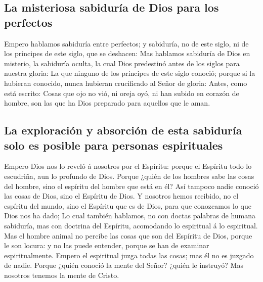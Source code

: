 \hypertarget{la-misteriosa-sabiduruxeda-de-dios-para-los-perfectos}{%
\subsection{La misteriosa sabiduría de Dios para los
perfectos}\label{la-misteriosa-sabiduruxeda-de-dios-para-los-perfectos}}

 Empero hablamos sabiduría entre perfectos; y sabiduría,
no de este siglo, ni de los príncipes de este siglo, que se deshacen:
 Mas hablamos sabiduría de Dios en misterio, la sabiduría
oculta, la cual Dios predestinó antes de los siglos para nuestra gloria:
 La que ninguno de los príncipes de este siglo conoció;
porque si la hubieran conocido, nunca hubieran crucificado al Señor de
gloria:  Antes, como está escrito: Cosas que ojo no vió,
ni oreja oyó, ni han subido en corazón de hombre, son las que ha Dios
preparado para aquellos que le aman.

\hypertarget{la-exploraciuxf3n-y-absorciuxf3n-de-esta-sabiduruxeda-solo-es-posible-para-personas-espirituales}{%
\subsection{La exploración y absorción de esta sabiduría solo es posible
para personas
espirituales}\label{la-exploraciuxf3n-y-absorciuxf3n-de-esta-sabiduruxeda-solo-es-posible-para-personas-espirituales}}

 Empero Dios nos lo reveló á nosotros por el Espíritu:
porque el Espíritu todo lo escudriña, aun lo profundo de Dios.
 Porque ¿quién de los hombres sabe las cosas del hombre,
sino el espíritu del hombre que está en él? Así tampoco nadie conoció
las cosas de Dios, sino el Espíritu de Dios.  Y nosotros
hemos recibido, no el espíritu del mundo, sino el Espíritu que es de
Dios, para que conozcamos lo que Dios nos ha dado;  Lo
cual también hablamos, no con doctas palabras de humana sabiduría, mas
con doctrina del Espíritu, acomodando lo espiritual á lo espiritual.
 Mas el hombre animal no percibe las cosas que son del
Espíritu de Dios, porque le son locura: y no las puede entender, porque
se han de examinar espiritualmente.  Empero el espiritual
juzga todas las cosas; mas él no es juzgado de nadie. 
Porque ¿quién conoció la mente del Señor? ¿quién le instruyó? Mas
nosotros tenemos la mente de Cristo.

